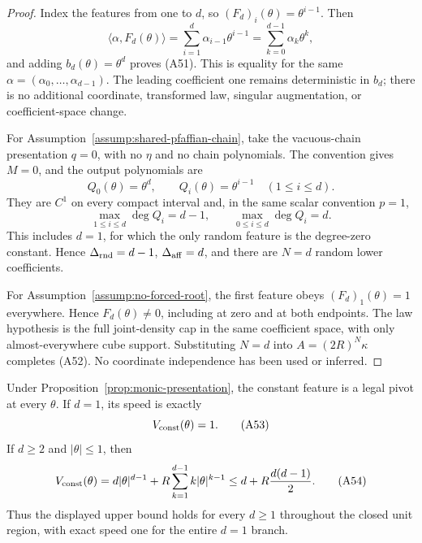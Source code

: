 \begin{proof}
Index the features from one to $d$, so $(F_d)_i(\theta)=\theta^{i-1}$.
Then
\[
\langle\alpha,F_d(\theta)\rangle
=\sum_{i=1}^d\alpha_{i-1}\theta^{i-1}
=\sum_{k=0}^{d-1}\alpha_k\theta^k,
\]
and adding $b_d(\theta)=\theta^d$ proves \textup{(A51)}.  This is equality
for the same $\alpha=(\alpha_0,\ldots,\alpha_{d-1})$.  The leading
coefficient one remains deterministic in $b_d$; there is no additional
coordinate, transformed law, singular augmentation, or coefficient-space
change.

For Assumption~\ref{assump:shared-pfaffian-chain}, take the vacuous-chain
presentation $q=0$, with no $\eta$ and no chain polynomials.  The convention
gives $M=0$, and the output polynomials are
\[
Q_0(\theta)=\theta^d,
\qquad Q_i(\theta)=\theta^{i-1}\quad(1\leq i\leq d).
\]
They are $C^1$ on every compact interval and, in the same scalar convention
$p=1$,
\[
\max_{1\leq i\leq d}\deg Q_i=d-1,
\qquad
\max_{0\leq i\leq d}\deg Q_i=d.
\]
This includes $d=1$, for which the only random feature is the degree-zero
constant.  Hence $\Delta_{\rm rnd}=d-1$, $\Delta_{\rm aff}=d$, and there
are $N=d$ random lower coefficients.

For Assumption~\ref{assump:no-forced-root}, the first feature obeys
$(F_d)_1(\theta)=1$ everywhere.  Hence $F_d(\theta)\neq0$, including at
zero and at both endpoints.  The law hypothesis is the full joint-density
cap in the same coefficient space, with only almost-everywhere cube support.
Substituting $N=d$ into $A=(2R)^N\kappa$ completes \textup{(A52)}.  No
coordinate independence has been used or inferred.
\end{proof}

\begin{lemma}
\label{lem:monic-constant-pivot}
Under Proposition~\ref{prop:monic-presentation}, the constant feature is a
legal pivot at every $\theta$.  If $d=1$, its speed is exactly
\[
V_{\rm const}(\theta)=1.
\tag{A53}
\]
If $d\geq2$ and $|\theta|\leq1$, then
\[
V_{\rm const}(\theta)
=d|\theta|^{d-1}+R\sum_{k=1}^{d-1}k|\theta|^{k-1}
\leq d+R\frac{d(d-1)}2.
\tag{A54}
\]
Thus the displayed upper bound holds for every $d\geq1$ throughout the
closed unit region, with exact speed one for the entire $d=1$ branch.
\end{lemma}


